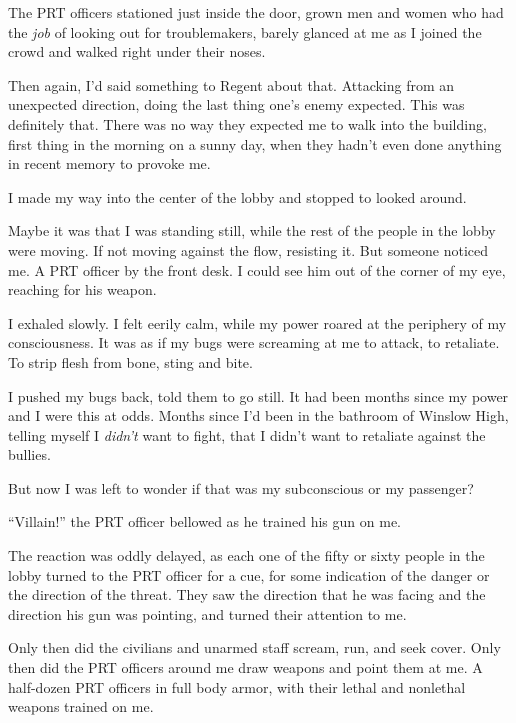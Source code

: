 The PRT officers stationed just inside the door, grown men and women who had the \emph{job} of looking out for troublemakers, barely glanced at me as I joined the crowd and walked right under their noses.



Then again, I'd said something to Regent about that.  Attacking from an unexpected direction, doing the last thing one's enemy expected.  This was definitely that.  There was no way they expected me to walk into the building, first thing in the morning on a sunny day, when they hadn't even done anything in recent memory to provoke me.



I made my way into the center of the lobby and stopped to looked around.



Maybe it was that I was standing still, while the rest of the people in the lobby were moving.  If not moving against the flow, resisting it.  But someone noticed me.  A PRT officer by the front desk.  I could see him out of the corner of my eye, reaching for his weapon.



I exhaled slowly.  I felt eerily calm, while my power roared at the periphery of my consciousness.  It was as if my bugs were screaming at me to attack, to retaliate.  To strip flesh from bone, sting and bite.



I pushed my bugs back, told them to go still.  It had been months since my power and I were this at odds.  Months since I'd been in the bathroom of Winslow High, telling myself\emph{ } I \emph{didn't} want to fight, that I didn't want to retaliate against the bullies.



But now I was left to wonder if that was my subconscious or my passenger?



``Villain!'' the PRT officer bellowed as he trained his gun on me.



The reaction was oddly delayed, as each one of the fifty or sixty people in the lobby turned to the PRT officer for a cue, for some indication of the danger or the direction of the threat.  They saw the direction that he was facing and the direction his gun was pointing, and turned their attention to me.



Only then did the civilians and unarmed staff scream, run, and seek cover.  Only then did the PRT officers around me draw weapons and point them at me.  A half-dozen PRT officers in full body armor, with their lethal and nonlethal weapons trained on me.



